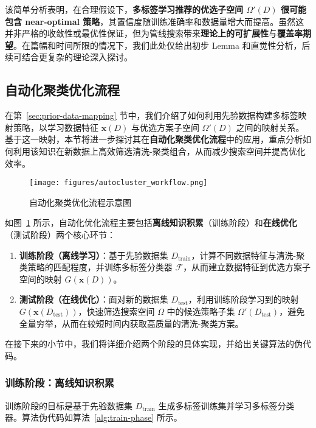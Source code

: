 \documentclass[10pt]{article} %
\numberwithin{equation}{section}
\begin{document}
该简单分析表明，在合理假设下，\textbf{多标签学习推荐的优选子空间 $\Omega'(D)$ 很可能包含 near-optimal 策略}，其置信度随训练准确率和数据量增大而提高。虽然这并非严格的收敛性或最优性保证，但为管线搜索带来\textbf{理论上的可扩展性}与\textbf{覆盖率期望}。在篇幅和时间所限的情况下，我们此处仅给出初步 Lemma 和直觉性分析，后续可结合更复杂的理论深入探讨。

\subsection{自动化聚类优化流程}
\label{sec:autocluster-process}

在第~\ref{sec:prior-data-mapping} 节中，我们介绍了如何利用先验数据构建多标签映射策略，以学习数据特征 $\mathbf{x}(D)$ 与优选方案子空间 $\Omega'(D)$ 之间的映射关系。基于这一映射，本节将进一步探讨其在\textbf{自动化聚类优化流程}中的应用，重点分析如何利用该知识在新数据上高效筛选清洗-聚类组合，从而减少搜索空间并提高优化效率。

\begin{figure}[htbp]
  \centering
  \texttt{[image: figures/autocluster\_workflow.png]}
  \caption{自动化聚类优化流程示意图}
  \label{fig:autocluster-workflow}
\end{figure}

如图~\ref{fig:autocluster-workflow} 所示，自动化优化流程主要包括\textbf{离线知识积累}（训练阶段）和\textbf{在线优化}（测试阶段）两个核心环节： \begin{enumerate} \item \textbf{训练阶段（离线学习）}：基于先验数据集 $D_{\text{train}}$，计算不同数据特征与清洗-聚类策略的匹配程度，并训练多标签分类器 $\mathcal{F}$，从而建立数据特征到优选方案子空间的映射 $G(\mathbf{x}(D))$。 \item \textbf{测试阶段（在线优化）}：面对新的数据集 $D_{\text{test}}$，利用训练阶段学习到的映射 $G(\mathbf{x}(D_{\text{test}}))$，快速筛选搜索空间 $\Omega$ 中的候选策略子集 $\Omega'(D_{\text{test}})$，避免全量穷举，从而在较短时间内获取高质量的清洗-聚类方案。 \end{enumerate}

在接下来的小节中，我们将详细介绍两个阶段的具体实现，并给出关键算法的伪代码。

\subsubsection{训练阶段：离线知识积累}
训练阶段的目标是基于先验数据集 \(D_{\text{train}}\) 生成多标签训练集并学习多标签分类器。算法伪代码如算法~\ref{alg:train-phase} 所示。
\end{document}
